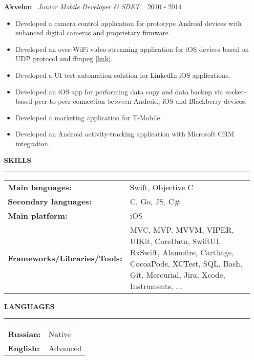 ﻿\documentclass{article}
\newcommand{\cvsection}[1]{
  \vspace{2.6ex}
  \noindent\textbf{\large{\uppercase{#1}}}
  \vspace{1ex}
  \hrule
  \vspace{1.5ex}
}
\newcommand{\cvparagraph}[3]{
  \noindent\indent
  \textbf{#1}
  \ 
  \textit{#2}
  \ 
  \hfill{}
  {#3}\vspace{1ex}}
\newcommand{\cvtable}[1]{
  {\renewcommand{\arraystretch}{1.2}
    \begin{tabular}{p{\dimexpr.4\textwidth-1\parindent}p{\dimexpr.6\textwidth}}
      #1
    \end{tabular}}
}
\newcommand{\cvlist}[1]{
  \begin{itemize}[topsep=0ex,leftmargin=*,itemsep=0ex,parsep=1ex,labelwidth=\parindent]
    #1
  \end{itemize}
}
\begin{document}
\cvparagraph{Akvelon}{Junior Mobile Developer \& SDET}{2010 - 2014}
\cvlist{
  \item Developed a camera control application for prototype Android devices with enhanced digital cameras and proprietary firmware.
  \item Developed an over-WiFi video streaming application for iOS devices based on UDP protocol and ffmpeg [\href{http://neuronbeta.com/chirpglobal/chirpvision/app/}{link}].
  \item Developed a UI test automation solution for LinkedIn iOS applications.
  \item Developed an iOS app for performing data copy and data backup via socket-based peer-to-peer connection between Android, iOS and Blackberry devices.
  \item Developed a marketing application for T-Mobile.
  \item Developed an Android activity-tracking application with Microsoft CRM integration.
}

\cvsection{Skills}
\cvtable{
  \textbf{Main languages:} & Swift, Objective C \\
  \textbf{Secondary languages:} & C, Go, JS, C\# \\
  \textbf{Main platform:} & iOS \\
  \textbf{Frameworks/Libraries/Tools:} & MVC, MVP, MVVM, VIPER, UIKit, CoreData, SwiftUI, RxSwift, Alamofire, Carthage, CocoaPods, XCTest, SQL, Bash, Git, Mercurial, Jira, Xcode, Instruments, ...
}

\cvsection{Languages}
\cvtable{
  \textbf{Russian:} & Native \\
  \textbf{English:} & Advanced \\
}
\end{document}
